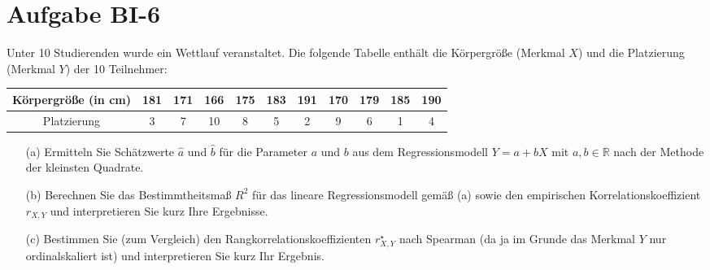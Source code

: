 
\section{Aufgabe BI-6}

\begin{task}
    Unter 10 Studierenden wurde ein Wettlauf veranstaltet. Die folgende Tabelle enthält die Körpergröße (Merkmal $X$) und die Platzierung (Merkmal $Y$) der 10 Teilnehmer:

    \begin{table}[H]
    \centering
    \begin{tabular}{c|cccccccccc}
        Körpergröße (in cm) & 181 & 171 & 166 & 175 & 183 &191 & 170 & 179 & 185 & 190 \\ \hline
        Platzierung & 3 & 7 & 10 & 8 & 5 & 2 & 9 & 6 & 1 & 4
    \end{tabular}
    \end{table}

    \begin{enumerate}
        \item[(a)] Ermitteln Sie Schätzwerte $\hat{a}$ und $\hat{b}$ für die Parameter $a$ und $b$ aus dem Regressionsmodell $Y=a+bX$ mit
        $a,b\in\mathbb{R}$
        nach der Methode der kleinsten Quadrate.
    \end{enumerate}
\end{task}

\begin{task}
    \begin{enumerate}
        \item[(b)] Berechnen Sie das Bestimmtheitsmaß $R^2$ für das lineare Regressionsmodell gemäß (a) sowie den empirischen Korrelationskoeffizient $r_{X,Y}$ und interpretieren Sie kurz Ihre Ergebnisse.
    \end{enumerate}
\end{task}

\begin{task}
    \begin{enumerate}
        \item[(c)] Bestimmen Sie (zum Vergleich) den Rangkorrelationskoeffizienten $r_{X,Y}^\star$ nach Spearman (da ja im Grunde das Merkmal $Y$ nur ordinalskaliert ist) und interpretieren Sie kurz Ihr Ergebnis.
    \end{enumerate}
\end{task}

